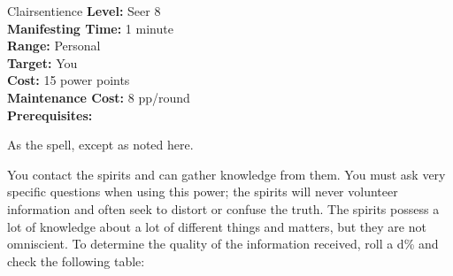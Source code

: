 {Clairsentience}
{
	\textbf{Level:}
	Seer 8\\
	\textbf{Manifesting Time:}
	1 minute\\
	\textbf{Range:}
	Personal\\
	\textbf{Target:}
	You\\
	\textbf{Cost:}
	15 power points\\
	\textbf{Maintenance Cost:}
	8 pp/round\\
	\textbf{Prerequisites:}
	\\
}
{
	As the  spell, except as noted here.

	You contact the spirits and can gather knowledge from them.	You must ask very specific questions when using this power; the spirits will never volunteer information and often seek to distort or confuse the truth. The spirits possess a lot of knowledge about a lot of different things and matters, but they are not omniscient. To determine the quality of the information received, roll a d\% and check the following table:

}